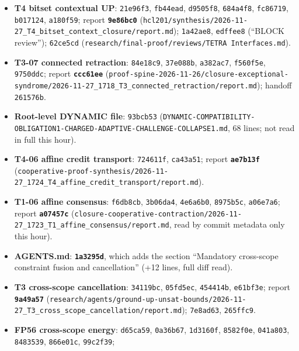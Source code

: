 \documentclass[11pt]{article}
\theoremstyle{definition}
\theoremstyle{remark}
\begin{document}
\begin{itemize}
\texttt{10ac3a1}, \texttt{a5db7cf}, \texttt{162ef3b}, \texttt{801c4f9}, \texttt{7a3979a},
\texttt{64d77da}, \texttt{6037a22}, \texttt{c5a5651}, \texttt{8c611ea}
(\texttt{four-partition-nae/2026-11-27\_1748\_T2\_binary\_interface/}, which has no report yet).
\item \textbf{T4 bitset contextual UP}: \texttt{21e96f3}, \texttt{fb44ead}, \texttt{d9505f8},
\texttt{684a4f8}, \texttt{fc86719}, \texttt{b017124}, \texttt{a180f59}; report
\textbf{\texttt{9e86bc0}} (\texttt{hcl201/synthesis/2026-11-27\_T4\_bitset\_context\_closure/report.md});
\texttt{1a42ae8}, \texttt{edffee8} (``BLOCK review''); \texttt{62ce5cd}
(\texttt{research/final-proof/reviews/TETRA Interfaces.md}).
\item \textbf{T3-07 connected retraction}: \texttt{84e18c9}, \texttt{37e088b}, \texttt{a382ac7},
\texttt{f560f5e}, \texttt{9750ddc}; report \textbf{\texttt{ccc61ee}}
(\texttt{proof-spine-2026-11-26/closure-exceptional-syndrome/2026-11-27\_1718\_T3\_connected\_retraction/report.md});
handoff \texttt{261576b}.
\item \textbf{Root-level DYNAMIC file}: \texttt{93bcb53}
(\texttt{DYNAMIC-COMPATIBILITY-OBLIGATION1-CHARGED-ADAPTIVE-CHALLENGE-COLLAPSE1.md},
68 lines; not read in full this hour).
\item \textbf{T4-06 affine credit transport}: \texttt{724611f}, \texttt{ca43a51}; report
\textbf{\texttt{ae7b13f}} (\texttt{cooperative-proof-synthesis/2026-11-27\_1724\_T4\_affine\_credit\_transport/report.md}).
\item \textbf{T1-06 affine consensus}: \texttt{f6db8cb}, \texttt{3b06da4}, \texttt{4e6a6b0},
\texttt{8975b5c}, \texttt{a06e7a6}; report \textbf{\texttt{a07457c}}
(\texttt{closure-cooperative-contraction/2026-11-27\_1723\_T1\_affine\_consensus/report.md},
read by commit metadata only this hour).
\item \textbf{AGENTS.md}: \textbf{\texttt{1a3295d}}, which adds the section ``Mandatory
cross-scope constraint fusion and cancellation'' (+12 lines, full diff read).
\item \textbf{T3 cross-scope cancellation}: \texttt{34119bc}, \texttt{05fd5ec}, \texttt{454414b},
\texttt{e61bf3e}; report \textbf{\texttt{9a49a57}}
(\texttt{research/agents/ground-up-unsat-bounds/2026-11-27\_T3\_cross\_scope\_cancellation/report.md});
\texttt{7e8ad63}, \texttt{265ffc9}.
\item \textbf{FP56 cross-scope energy}: \texttt{d65ca59}, \texttt{0a36b67}, \texttt{1d3160f},
\texttt{8582f0e}, \texttt{041a803}, \texttt{8483539}, \texttt{866e01c}, \texttt{99c2f39};

\end{itemize}
\end{document}
